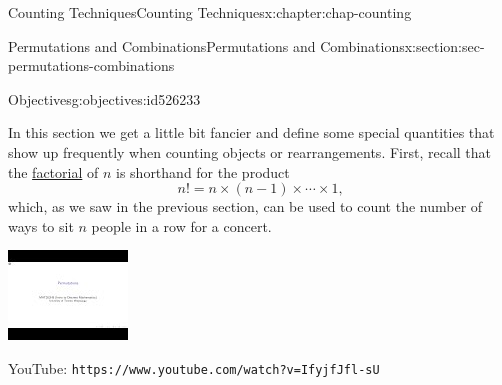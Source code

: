\documentclass[oneside,10pt,]{book}
\newcommand{\mono}[1]{\texttt{#1}}
\numberwithin{equation}{section}
\newlength{\qrsize}
\newlength{\previewwidth}
\begin{document}
\begin{chapterptx}{Counting Techniques}{}{Counting Techniques}{}{}{x:chapter:chap-counting}
\begin{sectionptx}{Permutations and Combinations}{}{Permutations and Combinations}{}{}{x:section:sec-permutations-combinations}
\begin{objectives}{Objectives}{g:objectives:id526233}
\begin{itemize}[label=\textbullet]
\end{itemize}
\end{objectives}
In this section we get a little bit fancier and define some special quantities that show up frequently when counting objects or rearrangements. First, recall that the \hyperref[x:definition:def-factorial]{factorial} of \(n\) is shorthand for the product%
\begin{equation*}
n! = n \times (n-1) \times \cdots \times 1\text{,}
\end{equation*}
which, as we saw in the previous section, can be used to count the number of ways to sit \(n\) people in a row for a concert.%
\begin{sidebyside}{1}{0}{0}{0}%
\begin{sbspanel}{1}%
\setlength{\qrsize}{9em}
\setlength{\previewwidth}{\linewidth}
\addtolength{\previewwidth}{-\qrsize}
\begin{tcbraster}[raster columns=2, raster column skip=1pt, raster halign=center, raster force size=false, raster left skip=0pt, raster right skip=0pt]%
\begin{tcolorbox}[previewstyle, width=\previewwidth]%
\includegraphics[width=0.80\linewidth,height=\qrsize,keepaspectratio]{images/video-permutation.jpg}%
\end{tcolorbox}%
\begin{tcolorbox}[qrstyle]%
{\hypersetup{urlcolor=black}}%
\end{tcolorbox}%
\begin{tcolorbox}[captionstyle]%
\small YouTube: \mono{https://www.youtube.com/watch?v=IfyjfJfl-sU}\end{tcolorbox}%
\end{tcbraster}%
\end{sbspanel}%

\end{sidebyside}
\end{sectionptx}
\end{chapterptx}
\end{document}
